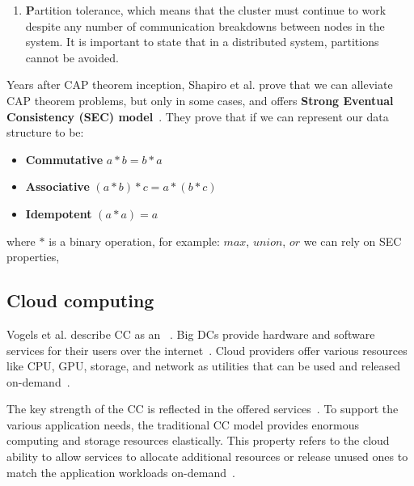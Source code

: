 \begin{enumerate} [start=1,label={(\bfseries \arabic*)}]
	\noindent
	We can calculate availability class if we have system availability $A$, the system's availability class is defined as~\cite{GrayS91}: 
	
	\begin{equation} 
		e^{\log_{10} \frac{1}{ (1 - A)}} 
	\end{equation}
	It is important to notice that even a 99\% available system gives almost four days of downtime in a year, which is unacceptable for services like Facebook, Google, AWS, etc. And when the service is down, companies are losing customers.
	\item \textbf{P}artition tolerance, which means that the cluster must continue to work despite any number of communication breakdowns between nodes in the system. It is important to state that in a distributed system, partitions cannot be avoided.
\end{enumerate}

\noindent
Years after CAP theorem inception, Shapiro et al. prove that we can alleviate CAP theorem problems, but only in some cases, and offers \textbf{Strong Eventual Consistency (SEC) model}~\cite{ShapiroPBZ11}. They prove that if we can represent our data structure to be: \label{crdts}

\begin{itemize}
	\item \textbf{Commutative} $a*b = b*a$ 
	\item \textbf{Associative} $(a*b)*c = a*(b*c)$ 
	\item \textbf{Idempotent} $(a * a) = a$ 
\end{itemize}

\noindent
where $*$ is a binary operation, for example: $max$, $union$, $or$ we can rely on SEC properties,
%
%
\subsection{Cloud computing}\label{sec:cloud_computing}
%
Vogels et al. describe CC as an ~\cite{Vogels}.  Big DCs provide hardware and software services for their users over the internet~\cite{AboveTheCloud}. Cloud providers offer various resources like CPU, GPU, storage, and network as utilities that can be used and released on-demand~\cite{ZhangCB10}. 

The key strength of the CC is reflected in the offered services~\cite{Vogels}. To support the various application needs, the traditional CC model provides enormous computing and storage resources elastically. This property refers to the cloud ability to allow services to allocate additional resources or release unused ones to match the application workloads on-demand~\cite{AssuncaoVB18}. 

